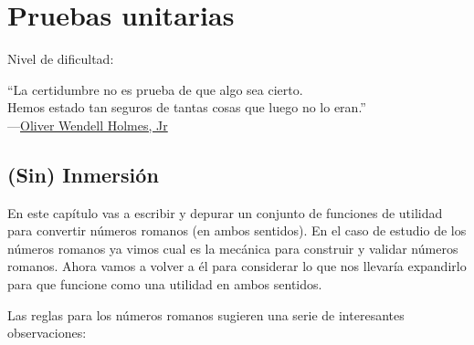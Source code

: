 
\chapter{Pruebas unitarias}\label{ch:pruebas_unitarias}

\noindent
Nivel de dificultad:\difll

\begin{citaCap}
``La certidumbre no es prueba de que algo sea cierto. \\
 Hemos estado tan seguros de tantas cosas que luego no lo eran.'' \\
---\href{http://en.wikiquote.org/wiki/Oliver\_Wendell\_Holmes,\_Jr.}{Oliver Wendell Holmes, Jr}
\end{citaCap}

\section{(Sin) Inmersión}

En este capítulo vas a escribir y depurar un conjunto de funciones de utilidad para convertir números romanos (en ambos sentidos). En el caso de estudio de los números romanos ya vimos cual es la mecánica para construir y validar números romanos. Ahora vamos a volver a él para considerar lo que nos llevaría expandirlo para que funcione como una utilidad en ambos sentidos.

Las reglas para los números romanos sugieren una serie de interesantes observaciones:

